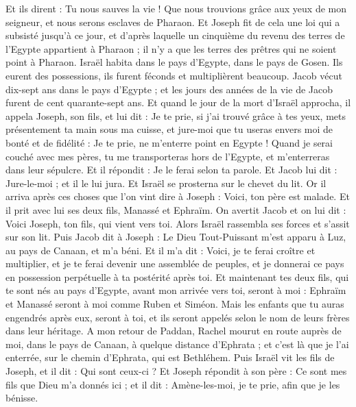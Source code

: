\begin{multicols}{2}
Et ils dirent : Tu nous sauves la vie ! Que nous trouvions grâce aux yeux de mon seigneur, et nous serons esclaves de Pharaon.
Et Joseph fit de cela une loi qui a subsisté jusqu'à ce jour, et d'après laquelle un cinquième du revenu des terres de l'Egypte appartient à Pharaon ; il n'y a que les terres des prêtres qui ne soient point à Pharaon.
Israël habita dans le pays d'Egypte, dans le pays de Gosen. Ils eurent des possessions, ils furent féconds et multiplièrent beaucoup.
Jacob vécut dix-sept ans dans le pays d'Egypte ; et les jours des années de la vie de Jacob furent de cent quarante-sept ans.
Et quand le jour de la mort d'Israël approcha, il appela Joseph, son fils, et lui dit : Je te prie, si j'ai trouvé grâce à tes yeux, mets présentement ta main sous ma cuisse, et jure-moi que tu useras envers moi de bonté et de fidélité : Je te prie, ne m'enterre point en Egypte !
Quand je serai couché avec mes pères, tu me transporteras hors de l'Egypte, et m'enterreras dans leur sépulcre. Et il répondit : Je le ferai selon ta parole.
Et Jacob lui dit : Jure-le-moi ; et il le lui jura. Et Israël se prosterna sur le chevet du lit.
\VerseOne{}Or il arriva après ces choses que l'on vint dire à Joseph : Voici, ton père est malade. Et il prit avec lui ses deux fils, Manassé et Ephraïm.
On avertit Jacob et on lui dit : Voici Joseph, ton fils, qui vient vers toi. Alors Israël rassembla ses forces et s'assit sur son lit.
Puis Jacob dit à Joseph : Le Dieu Tout-Puissant m'est apparu à Luz, au pays de Canaan, et m'a béni.
Et il m'a dit : Voici, je te ferai croître et multiplier, et je te ferai devenir une assemblée de peuples, et je donnerai ce pays en possession perpétuelle à ta postérité après toi.
Et maintenant tes deux fils, qui te sont nés au pays d'Egypte, avant mon arrivée vers toi, seront à moi : Ephraïm et Manassé seront à moi comme Ruben et Siméon.
Mais les enfants que tu auras engendrés après eux, seront à toi, et ils seront appelés selon le nom de leurs frères dans leur héritage.
A mon retour de Paddan, Rachel mourut en route auprès de moi, dans le pays de Canaan, à quelque distance d'Ephrata ; et c'est là que je l'ai enterrée, sur le chemin d'Ephrata, qui est Bethléhem.
Puis Israël vit les fils de Joseph, et il dit : Qui sont ceux-ci ?
Et Joseph répondit à son père : Ce sont mes fils que Dieu m'a donnés ici ; et il dit : Amène-les-moi, je te prie, afin que je les bénisse.

\end{multicols}
